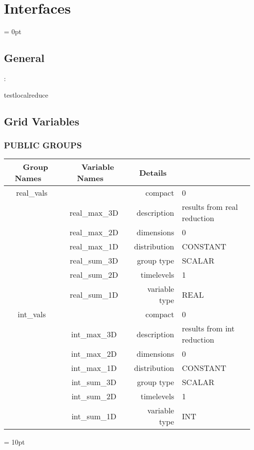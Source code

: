 
\section{Interfaces} 


\parskip = 0pt

\vspace{3mm} \subsection*{General}

: 

testlocalreduce
\vspace{2mm}
\subsection*{Grid Variables}
\vspace{5mm}\subsubsection{PUBLIC GROUPS}

\vspace{5mm}

\begin{tabular*}{150mm}{|c|c@{\extracolsep{\fill}}|rl|} \hline 
~ {\bf Group Names} ~ & ~ {\bf Variable Names} ~  &{\bf Details} ~ & ~\\ 
\hline 
real\_vals &  & compact & 0 \\ 
 & real\_max\_3D & description & results from real reduction \\ 
 & real\_max\_2D & dimensions & 0 \\ 
 & real\_max\_1D & distribution & CONSTANT \\ 
 & real\_sum\_3D & group type & SCALAR \\ 
 & real\_sum\_2D & timelevels & 1 \\ 
 & real\_sum\_1D & variable type & REAL \\ 
\hline 
int\_vals &  & compact & 0 \\ 
 & int\_max\_3D & description & results from int reduction \\ 
 & int\_max\_2D & dimensions & 0 \\ 
 & int\_max\_1D & distribution & CONSTANT \\ 
 & int\_sum\_3D & group type & SCALAR \\ 
 & int\_sum\_2D & timelevels & 1 \\ 
 & int\_sum\_1D & variable type & INT \\ 
\hline 
\end{tabular*} 



\vspace{5mm}\parskip = 10pt 
